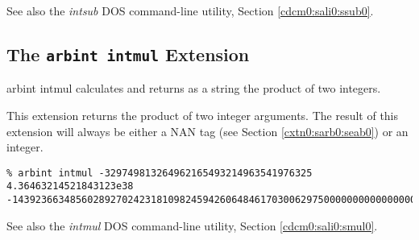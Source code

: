 \begin{tclcommandseealso}
See also the \emph{intsub} DOS command-line utility, 
Section \cdcmzeroxrefhyphen{}\ref{cdcm0:sali0:ssub0}.
\end{tclcommandseealso}


\subsection{The \texttt{arbint intmul} Extension}
\label{cxtn0:sarb0:smul0}

\begin{tclcommandname}{arbint intmul}%
calculates and returns as a string the product of two integers.
\end{tclcommandname}

\begin{tclcommandsynopsis}
\end{tclcommandsynopsis}

\begin{tclcommanddescription}
This extension returns the product of two integer arguments.
The result of this 
extension will always be either a NAN tag
(see Section \ref{cxtn0:sarb0:seab0}) 
or an integer.
\end{tclcommanddescription}

\begin{tclcommandsampleinvocations}
\begin{scriptsize}
\begin{verbatim}
% arbint intmul -329749813264962165493214963541976325 4.36463214521843123e38
-143923663485602892702423181098245942606484617030062975000000000000000000000
\end{verbatim}
\end{scriptsize}
\end{tclcommandsampleinvocations}

\begin{tclcommandseealso}
See also the \emph{intmul} DOS command-line utility, 
Section \cdcmzeroxrefhyphen{}\ref{cdcm0:sali0:smul0}.
\end{tclcommandseealso}


